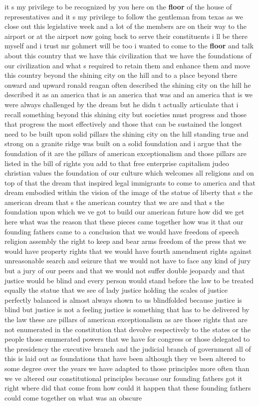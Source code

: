 \documentclass{article}
\begin{document}
\vspace{8mm}
it s my privilege to be recognized by you here on the {\bf \color{red} floor} of the house of representatives and it s my privilege to follow the gentleman from texas as we close out this legislative week and a lot of the members are on their way to the airport or at the airport now going back to serve their constituents i ll be there myself and i trust mr gohmert will be too i wanted to come to the {\bf \color{red} floor} and talk about this country that we have this civilization that we have the foundations of our civilization and what s required to retain them and enhance them and move this country beyond the shining city on the hill and to a place beyond there onward and upward ronald reagan often described the shining city on the hill he described it as an america that is an america that was and an america that is we were always challenged by the dream but he didn t actually articulate that i recall something beyond this shining city but societies must progress and those that progress the most effectively and those that can be sustained the longest need to be built upon solid pillars the shining city on the hill standing true and strong on a granite ridge was built on a solid foundation and i argue that the foundation of it are the pillars of american exceptionalism and those pillars are listed in the bill of rights you add to that free enterprise capitalism judeo christian values the foundation of our culture which welcomes all religions and on top of that the dream that inspired legal immigrants to come to america and that dream embodied within the vision of the image of the statue of liberty that s the american dream that s the american country that we are and that s the foundation upon which we ve got to build our american future how did we get here what was the reason that these pieces came together how was it that our founding fathers came to a conclusion that we would have freedom of speech religion assembly the right to keep and bear arms freedom of the press that we would have property rights that we would have fourth amendment rights against unreasonable search and seizure that we would not have to face any kind of jury but a jury of our peers and that we would not suffer double jeopardy and that justice would be blind and every person would stand before the law to be treated equally the statue that we see of lady justice holding the scales of justice perfectly balanced is almost always shown to us blindfolded because justice is blind but justice is not a feeling justice is something that has to be delivered by the law these are pillars of american exceptionalism as are those rights that are not enumerated in the constitution that devolve respectively to the states or the people those enumerated powers that we have for congress or those delegated to the presidency the executive branch and the judicial branch of government all of this is laid out as foundations that have been although they ve been altered to some degree over the years we have adapted to those principles more often than we ve altered our constitutional principles because our founding fathers got it right where did that come from how could it happen that these founding fathers could come together on what was an obscure 
\end{document}
